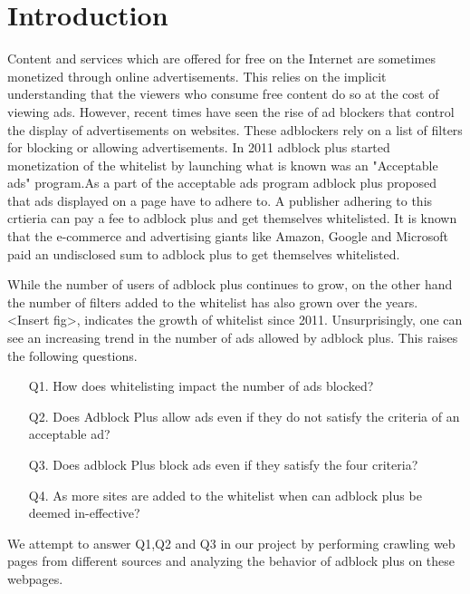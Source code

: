 \section{Introduction}
Content and services which are offered for free on the Internet are sometimes monetized through online advertisements.
This relies on the implicit understanding that the viewers who consume free content do so at the cost of viewing ads.
However, recent times have seen the  rise of ad blockers that control the display of  advertisements on websites. These adblockers rely on  a list of filters for blocking or allowing advertisements.
In 2011 adblock plus started monetization of the whitelist by launching what is known was an "Acceptable ads" program.As a part of the acceptable ads program adblock plus proposed  that ads  displayed on a page have to adhere to. A publisher adhering to this crtieria can pay a fee to adblock plus and get themselves whitelisted. It is known that the e-commerce and advertising giants like Amazon, Google and Microsoft paid an undisclosed sum to adblock plus to get themselves whitelisted.

While the number of users of adblock plus continues to grow, on the other hand the number of filters added to the whitelist has also grown over the years.
<Insert fig>, indicates the growth of whitelist since 2011.
Unsurprisingly, one can see an increasing trend in the number of ads allowed by adblock plus.
This raises the following questions.
\begin{itemize}
\item [Q1.] How does whitelisting impact the number of ads blocked? \label{q:q1}
\item [Q2.] Does Adblock Plus allow ads even if they do not satisfy the criteria of an acceptable ad? \label{q:q2}
\item [Q3.] Does adblock Plus block ads even if they satisfy the four criteria?
\item [Q4.] As more sites are added to the whitelist when can adblock plus be deemed in-effective?
\end{itemize}
We attempt to answer Q1,Q2 and Q3 in our project by performing crawling web pages from different sources and analyzing the behavior of adblock plus on these webpages.

